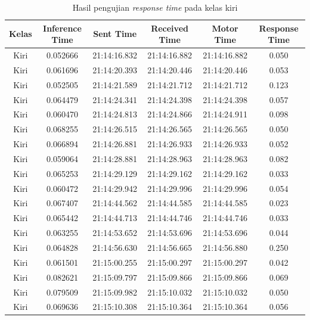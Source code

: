 \begin{longtable}{|c|c|c|c|c|c|}
  \caption{Hasil pengujian \emph{response time} pada kelas kiri}
  \label{tb:delaykiri} \\
  \hline
  \rowcolor[HTML]{C0C0C0}
      \textbf{Kelas} & \textbf{Inference Time} & \textbf{Sent Time} & \textbf{Received Time} & \textbf{Motor Time} & \textbf{Response Time} \\ \hline
      Kiri & 0.052666 & 21:14:16.832 & 21:14:16.882 & 21:14:16.882 & 0.050 \\ \hline
      Kiri & 0.061696 & 21:14:20.393 & 21:14:20.446 & 21:14:20.446 & 0.053 \\ \hline
      Kiri & 0.052505 & 21:14:21.589 & 21:14:21.712 & 21:14:21.712 & 0.123 \\ \hline
      Kiri & 0.064479 & 21:14:24.341 & 21:14:24.398 & 21:14:24.398 & 0.057 \\ \hline
      Kiri & 0.060470 & 21:14:24.813 & 21:14:24.866 & 21:14:24.911 & 0.098 \\ \hline
      Kiri & 0.068255 & 21:14:26.515 & 21:14:26.565 & 21:14:26.565 & 0.050 \\ \hline
      Kiri & 0.066894 & 21:14:26.881 & 21:14:26.933 & 21:14:26.933 & 0.052 \\ \hline
      Kiri & 0.059064 & 21:14:28.881 & 21:14:28.963 & 21:14:28.963 & 0.082 \\ \hline
      Kiri & 0.065253 & 21:14:29.129 & 21:14:29.162 & 21:14:29.162 & 0.033 \\ \hline
      Kiri & 0.060472 & 21:14:29.942 & 21:14:29.996 & 21:14:29.996 & 0.054 \\ \hline
      Kiri & 0.067407 & 21:14:44.562 & 21:14:44.585 & 21:14:44.585 & 0.023 \\ \hline
      Kiri & 0.065442 & 21:14:44.713 & 21:14:44.746 & 21:14:44.746 & 0.033 \\ \hline
      Kiri & 0.063255 & 21:14:53.652 & 21:14:53.696 & 21:14:53.696 & 0.044 \\ \hline
      Kiri & 0.064828 & 21:14:56.630 & 21:14:56.665 & 21:14:56.880  & 0.250 \\ \hline
      Kiri & 0.061501 & 21:15:00.255 & 21:15:00.297 & 21:15:00.297 & 0.042 \\ \hline
      Kiri & 0.082621  & 21:15:09.797 & 21:15:09.866 & 21:15:09.866 & 0.069 \\ \hline
      Kiri & 0.079509 & 21:15:09.982 & 21:15:10.032 & 21:15:10.032 & 0.050 \\ \hline
      Kiri & 0.069636 & 21:15:10.308 & 21:15:10.364 & 21:15:10.364 & 0.056 \\ \hline

\end{longtable}
